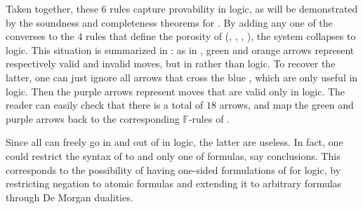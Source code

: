 \begin{description}
  Taken together, these $6$ rules capture provability in
  \emph{} logic, as will be demonstrated by the soundness
  and completeness theorems for . By adding any one of the
  converses to the $4$ rules that define the porosity of 
   (, , ,
  ), the system collapses to \emph{} logic. This
  situation is summarized in : as in
  , green and orange arrows represent respectively valid
  and invalid moves, but in  rather than
   logic. To recover the latter, one can just ignore all
  arrows that cross the blue , which are only useful in
   logic. Then the purple arrows represent moves that
  are valid only in  logic. The reader can easily check that there
  is a total of $18$ arrows, and map the green and purple arrows back to the
  corresponding $\mathbb{F}$-rules of .

  \begin{remark}
    Since all   can freely go in and out of
      in  logic, the latter are useless.
    In fact, one could restrict the syntax of  to 
     and only one  of formulas, say conclusions. This
    corresponds to the possibility of having one-sided formulations of
     for  logic, by restricting negation to
    atomic formulas and extending it to arbitrary formulas through De Morgan
    dualities.
  \end{remark}
  

\end{description}
